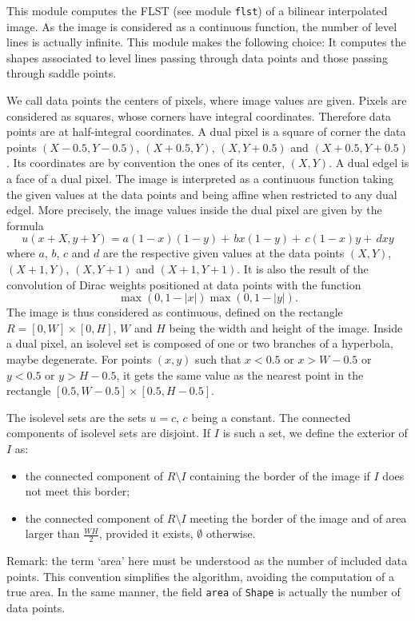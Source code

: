 This module computes the FLST (see module \texttt{flst}) 
of a bilinear interpolated image. 
As the image is considered as a continuous function, the
number of level lines is actually infinite. This module makes the following
choice: It computes the shapes associated to level lines passing through data
points and those passing through saddle points.

We call data points the centers of pixels, where image values are
given. Pixels are considered as squares, whose corners have integral
coordinates. Therefore data points are at half-integral coordinates.
A dual pixel is a square of corner the data points
$(X-0.5,Y-0.5)$, $(X+0.5,Y)$, $(X,Y+0.5)$ and $(X+0.5,Y+0.5)$. Its coordinates
are by convention the ones of its center, $(X,Y)$. A dual edgel is a face of
a dual pixel. The image is interpreted as a continuous function taking the
given values at the data points and being affine when restricted to any dual
edgel. More precisely, the image values inside the dual pixel are given by the
formula
$$
u(x+X,y+Y) = a (1-x)(1-y) +\,b x(1-y) +\,c (1-x)y +\,d xy
$$
where $a$, $b$, $c$ and $d$ are the respective given values at the data points
$(X,Y)$, $(X+1,Y)$, $(X,Y+1)$ and $(X+1,Y+1)$. It is also the result of the
convolution of Dirac weights positioned at data points with the function
$$
\max(0, 1-|x|)\max(0, 1-|y|).
$$
The image is thus considered as continuous, defined on the rectangle
$R = [0,W]\times [0,H]$, $W$ and $H$ being the width and
height of the image. Inside a dual pixel, an isolevel set is composed of one
or two branches of a hyperbola, maybe degenerate. For points $(x,y)$ such that
$x < 0.5$ or $x > W-0.5$ or $y <0.5$ or $y > H-0.5$, it gets the same value as
the nearest point in the rectangle $[0.5,W-0.5]\times [0.5,H-0.5]$.

The isolevel sets are the sets $u=c$, $c$ being a constant. The connected
components of isolevel sets are disjoint. If $I$ is such a set, we define the
exterior of $I$ as:
\begin{itemize}
\item the connected component of $R\setminus I$ containing the border of the
image if $I$ does not meet this border;
\item the connected component of $R\setminus I$ meeting the border of the
image and of area larger than $\frac{WH}{2}$, provided it exists, $\emptyset$
otherwise.
\end{itemize}
Remark: the term `area' here must be understood as the number of included data
points. This convention simplifies the algorithm, avoiding the computation of
a true area. In the same manner, the field \texttt{area} of \texttt{Shape} is
actually the number of data points.

